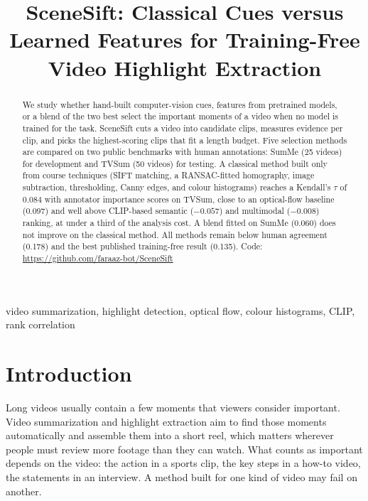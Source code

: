 \documentclass[conference]{IEEEtran}
\title{SceneSift: Classical Cues versus Learned Features for Training-Free Video Highlight Extraction}
\author{\IEEEauthorblockN{SceneSift Project Team}
\IEEEauthorblockA{CPS 843 / CP 8307: Computer Vision\\
Department of Computer Science}}
\begin{document}
\maketitle
\begin{abstract}
We study whether hand-built computer-vision cues, features from pretrained models, or a blend of the two best select the important moments of a video when no model is trained for the task. SceneSift cuts a video into candidate clips, measures evidence per clip, and picks the highest-scoring clips that fit a length budget. Five selection methods are compared on two public benchmarks with human annotations: SumMe (25 videos) for development and TVSum (50 videos) for testing. A classical method built only from course techniques (SIFT matching, a RANSAC-fitted homography, image subtraction, thresholding, Canny edges, and colour histograms) reaches a Kendall's $\tau$ of 0.084 with annotator importance scores on TVSum, close to an optical-flow baseline (0.097) and well above CLIP-based semantic ($-0.057$) and multimodal ($-0.008$) ranking, at under a third of the analysis cost. A blend fitted on SumMe (0.060) does not improve on the classical method. All methods remain below human agreement (0.178) and the best published training-free result (0.135). Code: \url{https://github.com/faraaz-bot/SceneSift}
\end{abstract}
\begin{IEEEkeywords}
video summarization, highlight detection, optical flow, colour histograms, CLIP, rank correlation
\end{IEEEkeywords}

\section{Introduction}
Long videos usually contain a few moments that viewers consider important. Video summarization and highlight extraction aim to find those moments automatically and assemble them into a short reel, which matters wherever people must review more footage than they can watch. What counts as important depends on the video: the action in a sports clip, the key steps in a how-to video, the statements in an interview. A method built for one kind of video may fail on another.
\end{document}
